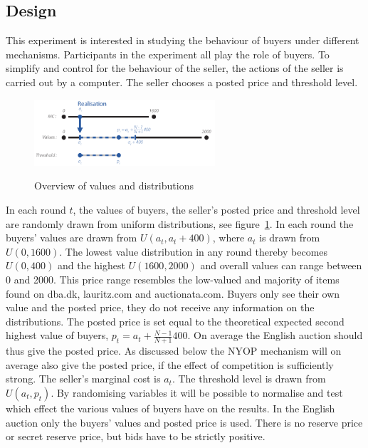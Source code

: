 \documentclass[a4paper,12pt]{article}
\begin{document}
	\subsection{Design}
	\label{sec:design}

	This experiment is interested in studying the behaviour of buyers under different mechanisms. Participants in the experiment all play the role of buyers. To simplify and control for the behaviour of the seller, the actions of the seller is carried out by a computer. The seller chooses a posted price and threshold level.

	\begin{figure}[h]
	        \centering
	        \caption{Overview of values and distributions}
	        \includegraphics[width=0.6\textwidth]{Figures/Distribution}
			\label{fig:distribution}
	\end{figure}

	In each round $t$, the values of buyers, the seller's posted price and threshold level are randomly drawn from uniform distributions, see figure~\ref{fig:distribution}. In each round the buyers' values are drawn from $U(a_t , a_t + 400)$, where $a_t$ is drawn from $U(0, 1600)$. The lowest value distribution in any round thereby becomes $U(0, 400)$ and the highest $U(1600, 2000)$ and overall values can range between 0 and 2000. This price range resembles the low-valued and majority of items found on dba.dk, lauritz.com and auctionata.com. Buyers only see their own value and the posted price, they do not receive any information on the distributions. The posted price is set equal to the theoretical expected second highest value of buyers, $p_t = a_t + \frac{N-1}{N+1}400$. On average the English auction should thus give the posted price. As discussed below the NYOP mechanism will on average also give the posted price, if the effect of competition is sufficiently strong. The seller's marginal cost is $a_t$. The threshold level is drawn from $U(a_t, p_t)$. By randomising variables it will be possible to normalise and test which effect the various values of buyers have on the results. In the English auction only the buyers' values and posted price is used. There is no reserve price or secret reserve price, but bids have to be strictly positive.
	
\end{document}
